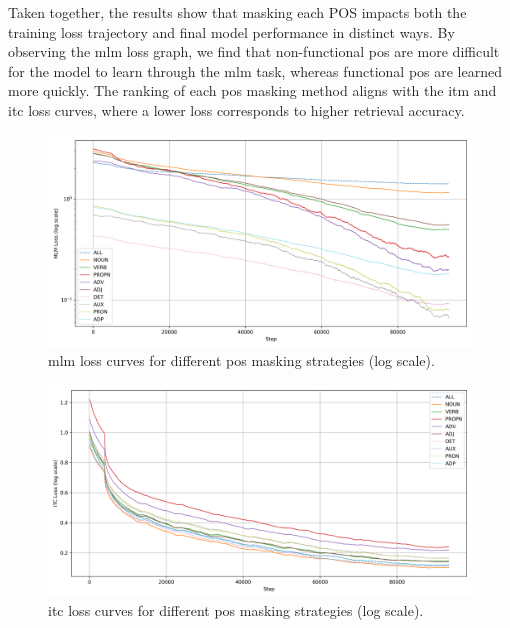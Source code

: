 Taken together, the results show that masking each POS impacts both the training loss trajectory and final model performance in distinct ways.  
By observing the \acrshort{mlm} loss graph, we find that non-functional \acrshort{pos} are more difficult for the model to learn through the \acrshort{mlm} task, whereas functional \acrshort{pos} are learned more quickly.
The ranking of each \acrshort{pos} masking method aligns with the \acrshort{itm} and \acrshort{itc} loss curves, where a lower loss corresponds to higher retrieval accuracy.

\begin{figure}[h]
    \caption{\acrshort{mlm} loss curves for different \acrshort{pos} masking strategies (log scale).}
    \label{fig:mlm_loss_pretrain}
    \begin{center}
        \includegraphics[width=1\textwidth]{Images/graph/mlm.png}
    \end{center}
\end{figure}

\begin{figure}[h]
    \caption{\acrshort{itc} loss curves for different \acrshort{pos} masking strategies (log scale).}
    \label{fig:itc_loss_pretrain}
    \begin{center}
        \includegraphics[width=1\textwidth]{Images/graph/itc.png}
    \end{center}
\end{figure}

